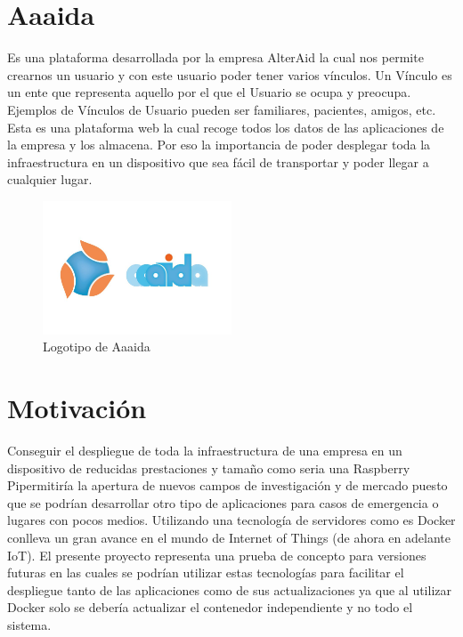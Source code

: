 \section{Aaaida}
Es una plataforma desarrollada por la empresa AlterAid la cual nos permite crearnos un usuario y con este usuario poder tener varios vínculos. Un Vínculo es un ente que representa aquello por el que el Usuario se ocupa y preocupa. Ejemplos de Vínculos de Usuario pueden ser familiares, pacientes, amigos, etc. 
Esta es una plataforma web la cual recoge todos los datos de las aplicaciones de la empresa y los almacena. Por eso la importancia de poder desplegar toda la infraestructura en un dispositivo que sea fácil de transportar y poder llegar a cualquier lugar.
\newpage
\begin{figure}[htb]
\begin{center}
\includegraphics[width=0.5\textwidth]{./setup/aaaidaLogo}
\caption{Logotipo de Aaaida}
\label{F:prova}
\end{center}
\end{figure}





\section{Motivación}

Conseguir el despliegue de toda la infraestructura de una empresa en un dispositivo de reducidas prestaciones y tamaño como seria una Raspberry Pipermitiría la apertura de nuevos campos de investigación y de mercado puesto que se podrían desarrollar otro tipo de aplicaciones para casos de emergencia o lugares con pocos medios. 
Utilizando una tecnología de servidores como es Docker conlleva un gran avance en el mundo de Internet of Things (de ahora en adelante IoT).
El presente proyecto representa una prueba de concepto para versiones futuras en las cuales se podrían utilizar estas tecnologías para facilitar el despliegue tanto de las aplicaciones como de sus actualizaciones ya que al utilizar Docker solo se debería actualizar el contenedor independiente y no todo el sistema.
